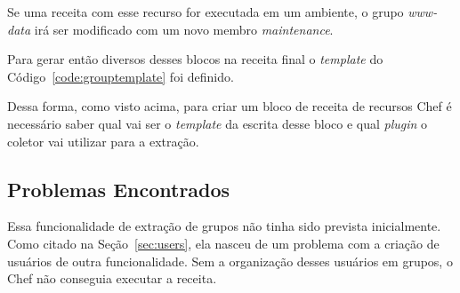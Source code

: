 Se uma receita com esse recurso for executada em um ambiente, o grupo \textit{www-data}
irá ser modificado com um novo membro \textit{maintenance}.

Para gerar então diversos desses blocos na receita final o \textit{template} do Código~\ref{code:grouptemplate} foi definido.

\noindent\begin{minipage}{\textwidth}
  \lstset{style=shell}
  
\end{minipage}\hfill

Dessa forma, como visto acima, para criar um bloco de receita de recursos Chef é
necessário saber qual vai ser o \textit{template} da escrita desse bloco e qual \textit{plugin}
o coletor vai utilizar para a extração.

\subsection{Problemas Encontrados}

Essa funcionalidade de extração de grupos não tinha sido prevista inicialmente.
Como citado na Seção~\ref{sec:users}, ela nasceu de um problema com a criação de usuários
de outra funcionalidade. Sem a organização desses usuários em grupos, o Chef não conseguia
executar a receita.

